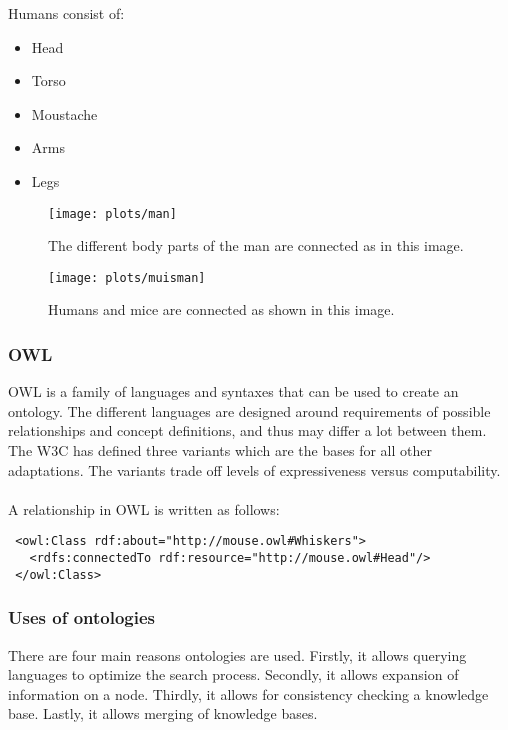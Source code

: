 \documentclass{article}
\begin{document}
\begin{minipage}{0.3\textwidth}
 Humans consist of:
 \begin{itemize}
 \item Head
 \item Torso
 \item Moustache
 \item Arms
 \item Legs
 \end{itemize}
\end{minipage} \hfill
\begin{minipage}{0.7\textwidth}
 \begin{figure}[H]
 \texttt{[image: plots/man]}
 \label{man_example}
 \caption[Human ontology]{The different body parts of the man are connected as in this image.}
 \end{figure}
\end{minipage}
  
 
 \begin{figure}[H]
 \centering
 \texttt{[image: plots/muisman]}
 \label{muis_man_example}
 \caption[Aligned ontologies]{Humans and mice are connected as shown in this image.}
 \end{figure}
 
 
 \subsubsection{OWL}
 OWL is a family of languages and syntaxes that can be used to create an ontology. The different languages are designed around requirements of possible relationships and concept definitions, and thus may differ a lot between them. The W3C has defined three variants which are the bases for all other adaptations. The variants trade off levels of expressiveness versus computability.
 \paragraph{}
 A relationship in OWL is written as follows:
 
 \lstset{language=XML}
 \begin{lstlisting}
 <owl:Class rdf:about="http://mouse.owl#Whiskers">
   <rdfs:connectedTo rdf:resource="http://mouse.owl#Head"/>
 </owl:Class>
 \end{lstlisting}
 
 \subsubsection{Uses of ontologies}
 There are four main reasons ontologies are used. Firstly, it allows querying languages to optimize the search process. Secondly, it allows expansion of information on a node. Thirdly, it allows for consistency checking a knowledge base. Lastly, it allows merging of knowledge bases.
\end{document}
